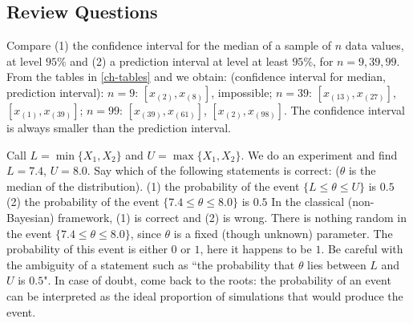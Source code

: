 %
%
%
%

\subsection{Review Questions}

 {Compare (1) the confidence interval for the median of a sample of $n$ data values, at level $95\%$
 and (2) a prediction interval at level at least $95\%$, for
 $n=9,39,99$.}
 {From the tables in \cref{ch-tables} and  we obtain:
 (confidence interval for median, prediction interval):
 $n=9$: $[x_{(2)},x_{(8)}]$, impossible;
 $n=39$: $[x_{(13)},x_{(27)}]$, $[x_{(1)},x_{(39)}]$;
 $n=99$: $[x_{(39)},x_{(61)}]$, $[x_{(2)},x_{(98)}]$.
 The confidence interval is always smaller than the prediction interval.
 }


 {Call $L=\min\{X_1, X_2\}$ and $U=\max\{X_1, X_2\}$. We do an experiment and find $L=7.4$, $U=8.0$.
 Say which of the following statements is correct: ($\theta$ is
 the median of the distribution).
 (1) the probability of the event  $\{L\leq \theta \leq U\}$ is $0.5$
 (2) the probability of the event  $\{7.4\leq \theta \leq 8.0\}$ is $0.5$
 }
 {In the classical (non-Bayesian) framework, (1) is correct and (2) is wrong.
 There is nothing random in the event $\{7.4\leq \theta \leq
 8.0\}$, since $\theta$ is a fixed (though unknown) parameter. The probability of this event is
 either $0$ or $1$, here it happens to be $1$. Be careful with the ambiguity of a statement such
 as ``the probability that $\theta$ lies between $L$ and $U$ is $0.5$". In case of doubt,
 come back to the roots: the probability of an event can be interpreted as the ideal proportion
 of simulations that would produce the event.}



